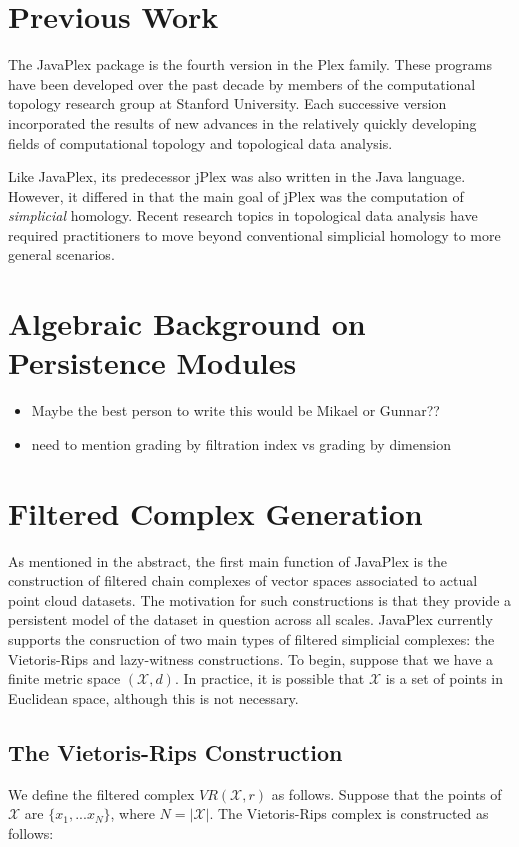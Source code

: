 \documentclass[10pt]{article}
\begin{document}
\section{Previous Work}

The JavaPlex package is the fourth version in the Plex family. These programs have been developed over the past decade by members of the computational topology research group at Stanford University. Each successive version incorporated the results of new advances in the relatively quickly developing fields of computational topology and topological data analysis.

Like JavaPlex, its predecessor jPlex was also written in the Java language. However, it differed in that the main goal of jPlex was the computation of \emph{simplicial} homology. Recent research topics in topological data analysis have required practitioners to move beyond conventional simplicial homology to more general scenarios.

\section{Algebraic Background on Persistence Modules}

\begin{itemize}
\item Maybe the best person to write this would be Mikael or Gunnar??
\item need to mention grading by filtration index vs grading by dimension
\end{itemize}

\section{Filtered Complex Generation}

As mentioned in the abstract, the first main function of JavaPlex is the construction of filtered chain complexes of vector spaces associated to actual point cloud datasets. The motivation for such constructions is that they provide a persistent model of the dataset in question across all scales. JavaPlex currently supports the consruction of two main types of filtered simplicial complexes: the Vietoris-Rips and lazy-witness constructions. To begin, suppose that we have a finite metric space $(\mathcal{X}, d)$. In practice, it is possible that $\mathcal{X}$ is a set of points in Euclidean space, although this is not necessary.

\subsection{The Vietoris-Rips Construction}
We define the filtered complex $VR(\mathcal{X}, r)$ as follows. Suppose that the points of $\mathcal{X}$ are $\{x_1, ... x_N\}$, where $N = |\mathcal{X}|$. The Vietoris-Rips complex is constructed as follows:
\end{document}
